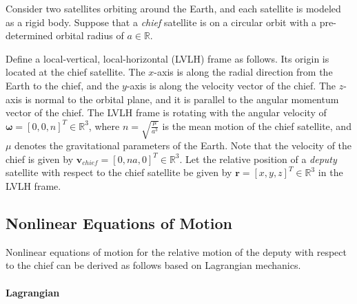 \documentclass[12pt,letterpaper]{ISSFD_v01}
\renewcommand{\Re}{\ensuremath{\mathbb{R}}}
\begin{document}
Consider two satellites orbiting around the Earth, and each satellite is modeled as a rigid body. Suppose that a \textit{chief} satellite is on a circular orbit with a pre-determined orbital radius of $a\in\Re$.

Define a local-vertical, local-horizontal (LVLH) frame as follows. Its origin is located at the chief satellite. The $x$-axis is along the radial direction from the Earth to the chief, and the $y$-axis is along the velocity vector of the chief. The $z$-axis is normal to the orbital plane, and it is parallel to the angular momentum vector of the chief. The LVLH frame is rotating with the angular velocity of $\mathbf{\omega}=[0,0,n]^T\in\Re^3$, where $n=\sqrt{\frac{\mu}{a^3}}$ is the mean motion of the chief satellite, and $\mu$ denotes the gravitational parameters of the Earth. Note that the velocity of the chief is given by $\mathbf{v}_{chief}=[0,na,0]^T\in\Re^3$. Let the relative position of a \textit{deputy} satellite with respect to the chief satellite be given by $\mathbf{r}=[x,y,z]^T\in\Re^3$ in the LVLH frame. 

\subsection{Nonlinear Equations of Motion}

Nonlinear equations of motion for the relative motion of the deputy with respect to the chief can be derived as follows based on Lagrangian mechanics. 

\paragraph{Lagrangian} 
\end{document}

